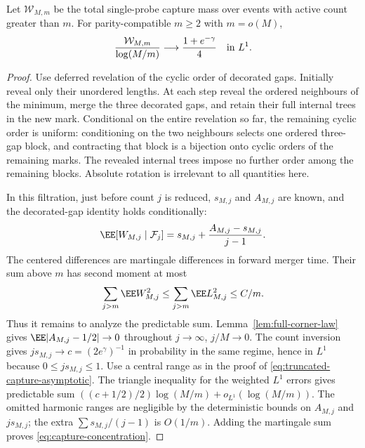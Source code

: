 \documentclass[11pt,letterpaper]{article}
\begin{document}
\begin{lemma}
\label{lem:capture-concentration}
Let $\mathcal W_{M,m}$ be the total single-probe capture mass over
events with active count greater than $m$. For parity-compatible
$m\ge2$ with $m=o(M)$,
\begin{equation}\label{eq:capture-concentration}
 \frac{\mathcal W_{M,m}}{\log(M/m)}
           \longrightarrow\frac{1+e^{-\gamma}}4
                                      \quad\hbox{in }L^1.
\end{equation}
\end{lemma}
\begin{proof}
Use deferred revelation of the cyclic order of decorated gaps.
Initially reveal only their unordered lengths. At each step reveal
the ordered neighbours of the minimum, merge the three decorated
gaps, and retain their full internal trees in the new mark.
Conditional on the entire revelation so far, the remaining cyclic
order is uniform: conditioning on the two neighbours selects one
ordered three-gap block, and contracting that block is a bijection
onto cyclic orders of the remaining marks. The revealed internal
trees impose no further order among the remaining blocks.
Absolute rotation is irrelevant to all quantities here.

In this filtration, just before count $j$ is reduced, $s_{M,j}$
and $A_{M,j}$ are known, and the decorated-gap identity holds
conditionally:
\[
 \EE[W_{M,j}\mid\mathcal F_j]
     =s_{M,j}+\frac{A_{M,j}-s_{M,j}}{j-1}.
\]
The centered differences are martingale differences in forward
merger time. Their sum above $m$ has second moment at most
\[
 \sum_{j>m}\EE W_{M,j}^2
          \le\sum_{j>m}\EE L_{M,j}^2\le C/m.
\]
Thus it remains to analyze the predictable sum.
Lemma~\ref{lem:full-corner-law} gives
$\EE|A_{M,j}-1/2|\to0$ throughout $j\to\infty$, $j/M\to0$.
The count inversion gives $j s_{M,j}\to c=(2e^\gamma)^{-1}$ in
probability in the same regime, hence in $L^1$ because
$0\le j s_{M,j}\le1$.
Use a central range as in the proof of
\eqref{eq:truncated-capture-asymptotic}. The triangle inequality
for the weighted $L^1$ errors gives predictable sum
$((c+1/2)/2)\log(M/m)+o_{L^1}(\log(M/m))$.
The omitted harmonic ranges are negligible by the deterministic
bounds on $A_{M,j}$ and $j s_{M,j}$; the extra
$\sum s_{M,j}/(j-1)$ is $O(1/m)$.
Adding the martingale sum proves \eqref{eq:capture-concentration}.
\end{proof}
\end{document}
